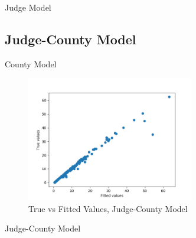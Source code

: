 \documentclass[11pt]{article}
\begin{document}
    \begin{table}[H]
      \centering
      \caption{Judge Model}
      
    \end{table}

  \subsection{Judge-County Model}

    \begin{table}[H]
      \centering
      \caption{County Model}
      
    \end{table}

    \begin{figure}[H]
      \centering
      \includegraphics[width=0.65\textwidth]{../../../output/figures/Exploration/fit_min_JudgeIDCounty}
      \caption{True vs Fitted Values, Judge-County Model}
    \end{figure}

    \begin{table}[H]
      \centering
      \caption{Judge-County Model}
      
    \end{table}
\end{document}
